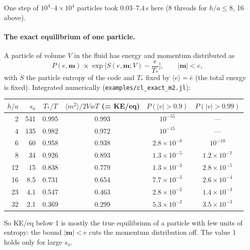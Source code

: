 \documentclass[11pt,aps,preprint,nofootinbib,superscriptaddress,tightenlines]{revtex4-2}
\def\st{\begin{equation}}
\def\stp{\end{equation}}
\newcommand{\avg}[1]{\langle #1\rangle}
\let\oldparagraph\paragraph
\renewcommand{\paragraph}{\par\bigskip\oldparagraph}
\begin{document}
One step of $10^4$--$4\times10^4$ particles took $0.03$--$7.4$\,s here (8 threads for $h/a\le8$, 16
above).

\paragraph{The exact equilibrium of one particle.}  A particle of volume $V$ in the fluid has
energy and momentum distributed as
\st
P(e,\bm m)\propto\exp\!\Big[S(e,\bm m;V)-\frac{e}{T_*}\Big],\qquad|\bm m|<e,
\stp
with $S$ the particle entropy of the code and $T_*$ fixed by $\avg{e}=\bar e$ (the total energy is
fixed).  Integrated numerically (\texttt{examples/cl\_exact\_m2.jl}):
\begin{center}
\begin{tabular}{rrcccc}
\hline
$h/a$ & $s_a$ & $T_*/T$ & $\avg{m^2}/2VwT$ (= KE/eq) & $P(|v|>0.9)$ & $P(|v|>0.99)$ \\ \hline
2 & 541 & 0.995 & 0.993 & $10^{-55}$ & --- \\
4 & 135 & 0.982 & 0.972 & $10^{-15}$ & --- \\
6 & 60 & 0.958 & 0.938 & $2.8\times10^{-8}$ & $10^{-10}$ \\
8 & 34 & 0.926 & 0.893 & $1.3\times10^{-5}$ & $1.2\times10^{-7}$ \\
12 & 15 & 0.838 & 0.779 & $1.3\times10^{-3}$ & $2.8\times10^{-5}$ \\
16 & 8.5 & 0.731 & 0.654 & $7.7\times10^{-3}$ & $2.6\times10^{-4}$ \\
23 & 4.1 & 0.547 & 0.463 & $2.8\times10^{-2}$ & $1.4\times10^{-3}$ \\
32 & 2.1 & 0.369 & 0.299 & $5.3\times10^{-2}$ & $3.5\times10^{-3}$ \\
\hline
\end{tabular}
\end{center}
So KE/eq below 1 is mostly the true equilibrium of a particle with few units of entropy: the bound
$|\bm m|<e$ cuts the momentum distribution off.  The value 1 holds only for large $s_a$.
\end{document}

